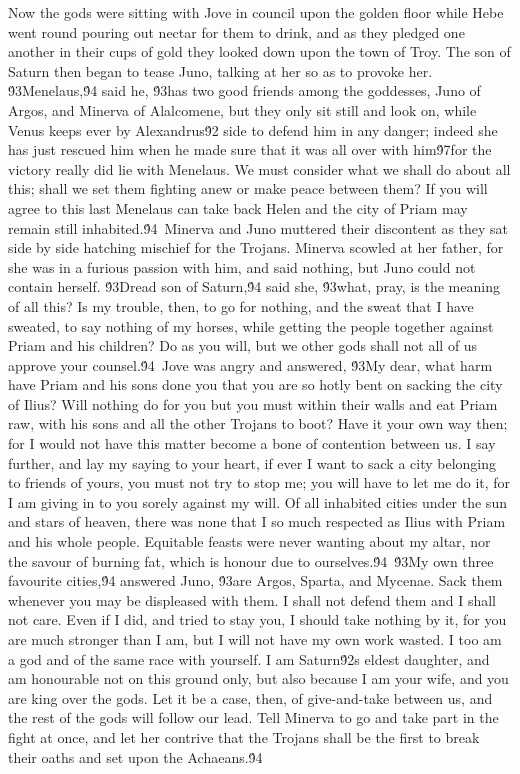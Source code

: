 {  Now the gods were sitting with Jove in council upon the golden floor while Hebe went round pouring out nectar for them to drink, and as they pledged one another in their cups of gold they looked down upon the town of Troy. The son of Saturn then began to tease Juno, talking at her so as to provoke her. \'93Menelaus,\'94 said he, \'93has two good friends among the goddesses, Juno of Argos, and Minerva of Alalcomene, but they only sit still and look on, while Venus keeps ever by Alexandrus\'92 side to defend him in any danger; indeed she has just rescued him when he made sure that it was all over with him\'97for the victory really did lie with Menelaus. We must consider what we shall do about all this; shall we set them fighting anew or make peace between them? If you will agree to this last Menelaus can take back Helen and the city of Priam may remain still inhabited.\'94\
Minerva and Juno muttered their discontent as they sat side by side hatching mischief for the Trojans. Minerva scowled at her father, for she was in a furious passion with him, and said nothing, but Juno could not contain herself. \'93Dread son of Saturn,\'94 said she, \'93what, pray, is the meaning of all this? Is my trouble, then, to go for nothing, and the sweat that I have sweated, to say nothing of my horses, while getting the people together against Priam and his children? Do as you will, but we other gods shall not all of us approve your counsel.\'94\
Jove was angry and answered, \'93My dear, what harm have Priam and his sons done you that you are so hotly bent on sacking the city of Ilius? Will nothing do for you but you must within their walls and eat Priam raw, with his sons and all the other Trojans to boot? Have it your own way then; for I would not have this matter become a bone of contention between us. I say further, and lay my saying to your heart, if ever I want to sack a city belonging to friends of yours, you must not try to stop me; you will have to let me do it, for I am giving in to you sorely against my will. Of all inhabited cities under the sun and stars of heaven, there was none that I so much respected as Ilius with Priam and his whole people. Equitable feasts were never wanting about my altar, nor the savour of burning fat, which is honour due to ourselves.\'94\
\'93My own three favourite cities,\'94 answered Juno, \'93are Argos, Sparta, and Mycenae. Sack them whenever you may be displeased with them. I shall not defend them and I shall not care. Even if I did, and tried to stay you, I should take nothing by it, for you are much stronger than I am, but I will not have my own work wasted. I too am a god and of the same race with yourself. I am Saturn\'92s eldest daughter, and am honourable not on this ground only, but also because I am your wife, and you are king over the gods. Let it be a case, then, of give-and-take between us, and the rest of the gods will follow our lead. Tell Minerva to go and take part in the fight at once, and let her contrive that the Trojans shall be the first to break their oaths and set upon the Achaeans.\'94\
}

